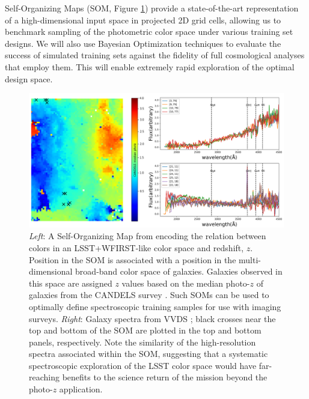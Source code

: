 Self-Organizing Maps (SOM, Figure \ref{fig:SOM}) provide a
state-of-the-art representation of a high-dimensional input space in
projected 2D grid cells, allowing us to benchmark sampling of the
photometric color space under various training set designs. We will
also use Bayesian Optimization techniques to evaluate the success of
simulated training sets against the fidelity of full cosmological
analyses that employ them. This will enable extremely rapid
exploration of the optimal design space.


\begin{figure}[h!]
\vskip -0.1in
\includegraphics[width=\textwidth]{figs/Hemmati18_Fig8_VVDS_spec.png}
\caption{\small {\it Left}: A Self-Organizing Map
\citep[SOM;][]{1990Natur.346...24K} from \citet{hemmati18} encoding
the relation between colors in an LSST+WFIRST-like color space and
redshift, $z$. Position in the SOM is associated with a position in
the multi-dimensional broad-band color space of galaxies. Galaxies
observed in this space are assigned $z$ values based on the median
photo-$z$ of galaxies from the CANDELS survey \citep[color
bar;][]{2011ApJS..197...35G}. Such SOMs can be used to optimally
define spectroscopic training samples for use with imaging surveys.
{\it Right}: Galaxy spectra from VVDS \citep{2005A&A...439..845L};
black crosses near the top and bottom of the SOM are plotted in the
top and bottom panels, respectively. Note the similarity of the
high-resolution spectra associated within the SOM, suggesting that a
systematic spectroscopic exploration of the LSST color space would
have far-reaching benefits to the science return of the mission
beyond the photo-$z$ application.}
\label{fig:SOM}
\end{figure}


